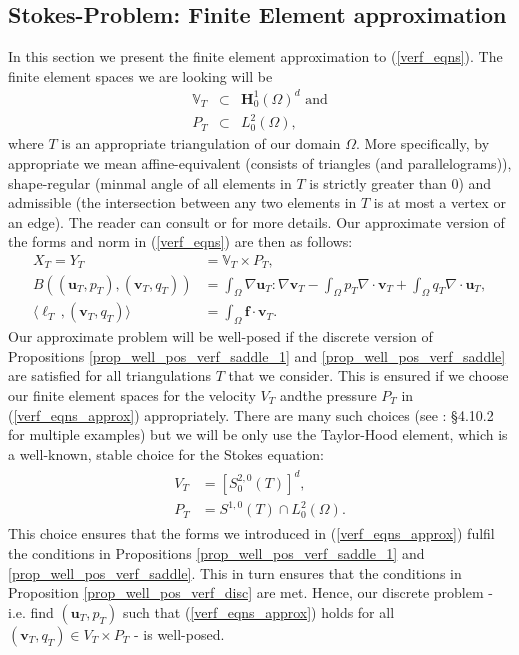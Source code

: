 \documentclass[12pt,a4paper]{article}
\theoremstyle{definition}
\begin{document}
\subsection{Stokes-Problem: Finite Element approximation}
In this section we present the finite element approximation to (\ref{verf_eqns}).  The finite element spaces we are looking will be
\begin{eqnarray}
	\mathbb{V}_T&\subset&\textbf{H}^1_0\left(\Omega\right)^d \text{ and}\nonumber\\
	P_T&\subset& L^2_0\left(\Omega\right),\nonumber
\end{eqnarray}
where $T$ is an appropriate triangulation of our domain $\Omega$.  More specifically, by appropriate we mean affine-equivalent (consists of triangles (and parallelograms)), shape-regular (minmal angle of all elements in $T$ is strictly greater than $0$)  and admissible (the intersection between any two elements in $T$ is at most a vertex or an edge).  The reader can consult \cite{verfurth2013posteriori} or \cite{brenner2007mathematical} for more details.
Our approximate version of the forms and norm in (\ref{verf_eqns}) are then as follows:
\begin{equation}\label{verf_eqns_approx}
\begin{aligned}
X_T=Y_T&=\mathbb{V}_T\times P_T,\\
B\left(\left(\textbf{u}_T,p_T\right),\left(\textbf{v}_T,q_T\right)\right)&=\int_{\Omega}\nabla \textbf{u}_T : \nabla \textbf{v}_T - \int_{\Omega} p_T \nabla\cdot\textbf{v}_T + \int_{\Omega} q_T \nabla\cdot\textbf{u}_T,\\
\langle \ell_T\,,\left(\textbf{v}_T,q_T\right) \rangle &= \int_{\Omega}\textbf{f}\cdot \textbf{v}_T.
\end{aligned}
\end{equation}
Our approximate problem will be well-posed if the discrete version of Propositions \ref{prop_well_pos_verf_saddle_1} and \ref{prop_well_pos_verf_saddle} are satisfied for all triangulations $T$ that we consider.  This is ensured if we choose our finite element spaces for the velocity $V_T$ andthe pressure $P_T$ in (\ref{verf_eqns_approx}) appropriately.
There are many such choices (see \cite{verfurth2013posteriori}: \S 4.10.2 for multiple examples) but we will be only use the Taylor-Hood element, which is a well-known, stable choice for the Stokes equation:
\begin{eqnarray}
\begin{aligned}
V_T&=\left[S^{2,0}_0\left(T\right)\right]^d,\\
P_T&=S^{1,0}\left(T\right)\cap L^2_0\left(\Omega\right).
\end{aligned}
\end{eqnarray}
This choice ensures that the forms we introduced in (\ref{verf_eqns_approx}) fulfil the conditions in Propositions \ref{prop_well_pos_verf_saddle_1} and \ref{prop_well_pos_verf_saddle}.  This in turn ensures that the conditions in Proposition \ref{prop_well_pos_verf_disc} are met.  Hence, our discrete problem - i.e. find $\left(\textbf{u}_T, p_T\right)$ such that (\ref{verf_eqns_approx}) holds for all $\left(\textbf{v}_T,q_T\right)\in V_T\times P_T$ - is well-posed.
\end{document}
